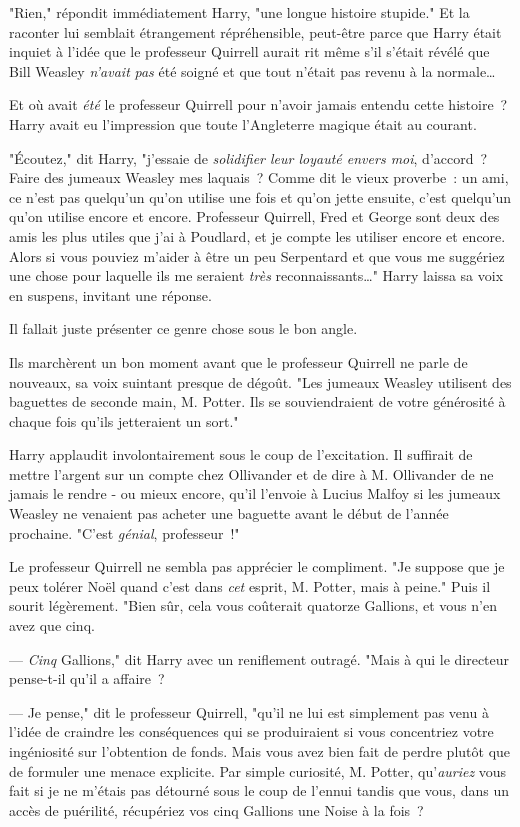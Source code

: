 "Rien," répondit immédiatement Harry, "une longue histoire stupide." Et la raconter lui semblait étrangement répréhensible, peut-être parce que Harry était inquiet à l'idée que le professeur Quirrell aurait rit même s'il s'était révélé que Bill Weasley \emph{n'avait} \emph{pas} été soigné et que tout n'était pas revenu à la normale…

Et où avait \emph{été} le professeur Quirrell pour n'avoir jamais entendu cette histoire~? Harry avait eu l'impression que toute l'Angleterre magique était au courant.

"Écoutez," dit Harry, "j'essaie de \emph{solidifier leur loyauté envers moi}, d'accord~? Faire des jumeaux Weasley mes laquais~? Comme dit le vieux proverbe~: un ami, ce n'est pas quelqu'un qu'on utilise une fois et qu'on jette ensuite, c'est quelqu'un qu'on utilise encore et encore. Professeur Quirrell, Fred et George sont deux des amis les plus utiles que j'ai à Poudlard, et je compte les utiliser encore et encore. Alors si vous pouviez m'aider à être un peu Serpentard et que vous me suggériez une chose pour laquelle ils me seraient \emph{très} reconnaissants…" Harry laissa sa voix en suspens, invitant une réponse.

Il fallait juste présenter ce genre chose sous le bon angle.

Ils marchèrent un bon moment avant que le professeur Quirrell ne parle de nouveaux, sa voix suintant presque de dégoût. "Les jumeaux Weasley utilisent des baguettes de seconde main, M. Potter. Ils se souviendraient de votre générosité à chaque fois qu'ils jetteraient un sort."

Harry applaudit involontairement sous le coup de l'excitation. Il suffirait de mettre l'argent sur un compte chez Ollivander et de dire à M. Ollivander de ne jamais le rendre - ou mieux encore, qu'il l'envoie à Lucius Malfoy si les jumeaux Weasley ne venaient pas acheter une baguette avant le début de l'année prochaine. "C'est \emph{génial}, professeur~!"

Le professeur Quirrell ne sembla pas apprécier le compliment. "Je suppose que je peux tolérer Noël quand c'est dans \emph{cet} esprit, M. Potter, mais à peine." Puis il sourit légèrement. "Bien sûr, cela vous coûterait quatorze Gallions, et vous n'en avez que cinq.

--- \emph{Cinq} Gallions," dit Harry avec un reniflement outragé. "Mais à qui le directeur pense-t-il qu'il a affaire~?

--- Je pense," dit le professeur Quirrell, "qu'il ne lui est simplement pas venu à l'idée de craindre les conséquences qui se produiraient si vous concentriez votre ingéniosité sur l'obtention de fonds. Mais vous avez bien fait de perdre plutôt que de formuler une menace explicite. Par simple curiosité, M. Potter, qu'\emph{auriez} vous fait si je ne m'étais pas détourné sous le coup de l'ennui tandis que vous, dans un accès de puérilité, récupériez vos cinq Gallions une Noise à la fois~?

